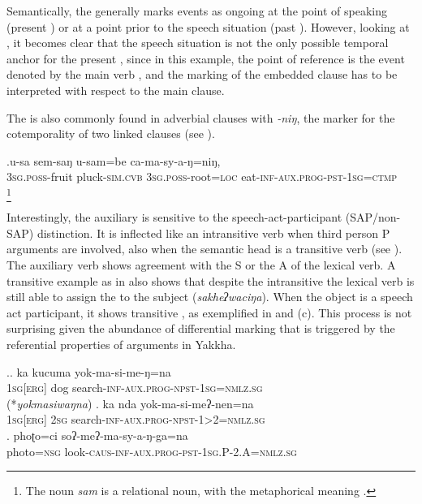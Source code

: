 Semantically, the  generally marks events as ongoing at the point of speaking (present ) or at a point prior to the speech situation (past ). However, looking at \Last[c], it becomes clear that the speech situation is not the only possible temporal anchor for the present , since in this example, the  point of reference is the event denoted by the main verb , and the  marking of the embedded clause has to be interpreted with respect to the main clause.


The  is also commonly found in adverbial clauses with \emph{-niŋ}, the marker for the cotemporality of two linked clauses (see \Next). 

\exg.u-sa   sem-saŋ        u-sam=be               ca-ma-sy-a-ŋ=niŋ, \\
{\scshape 3sg.poss-}fruit pluck{\scshape -sim.cvb}  {\scshape 3sg.poss-}root{\scshape =loc} eat{\scshape -inf-aux.prog-pst-1sg=ctmp}\\
\footnote{The noun \emph{sam} is a relational noun,  with the metaphorical meaning .} 

Interestingly, the  auxiliary is sensitive to the speech-act-participant (SAP/non-SAP) distinction. It is inflected like an intransitive verb when  third person P arguments are involved, also when the semantic head is a transitive verb (see \Next[a]). The auxiliary verb shows  agreement with the S or the A of the lexical verb. A transitive example as in \LLast[c] also shows that despite the intransitive   the lexical verb is still able to assign the   to the subject (\emph{sakheʔwaciŋa}).  When the object is a speech act participant, it shows transitive , as exemplified in \Next[b] and (c). This process is not surprising given the abundance of differential marking that is triggered by the referential properties of arguments in Yakkha.

\ex.\ag. ka kucuma yok-ma-si-me-ŋ=na\\
	{\scshape 1sg[erg]} dog search-{\scshape inf-aux.prog-npst-1sg=nmlz.sg}\\
	  (*\emph{yokmasiwaŋna})
\bg. ka nda yok-ma-si-meʔ-nen=na\\
{\scshape 1sg[erg]} {\scshape 2sg} search-{\scshape inf-aux.prog-npst-1>2=nmlz.sg}\\
\bg. phoʈo=ci soʔ-meʔ-ma-sy-a-ŋ-ga=na\\
photo{\scshape =nsg} look{\scshape -caus-inf-aux.prog-pst-1sg.P-2.A=nmlz.sg}\\

